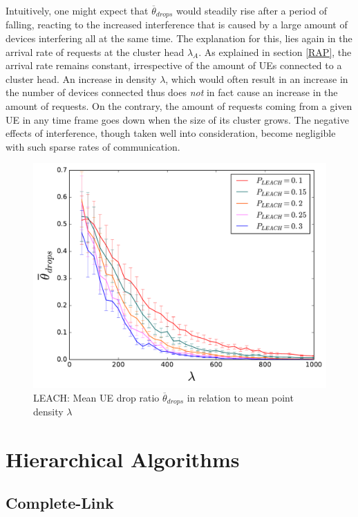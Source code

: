 Intuitively, one might expect that $\overline{\theta}_{drops}$ would steadily rise after a period of falling, reacting to the increased interference that is caused by a large amount of devices interfering all at the same time. The explanation for this, lies again in the arrival rate of requests at the cluster head $\lambda_A$. As explained in section \ref{RAP}, the arrival rate remains constant, irrespective of the amount of UEs connected to a cluster head. An increase in density $\lambda$, which would often result in an increase in the number of devices connected thus does \textit{not} in fact cause an increase in the amount of requests. On the contrary, the amount of requests coming from a given UE in any time frame goes down when the size of its cluster grows. The negative effects of interference, though taken well into consideration, become negligible with such sparse rates of communication.

\begin{figure}
\centering
\captionsetup{justification=centering}
\includegraphics[width=0.7\linewidth]{figures/LEACHLINES_10}
\caption{LEACH: Mean UE drop ratio $\overline{\theta}_{drops}$ in relation to mean point density $\lambda$ }
\label{fig:LEACHLINES_10}
\end{figure}

\section{Hierarchical Algorithms}\label{description:HIERA}
\subsection{Complete-Link}\label{description:COMPLETE}

